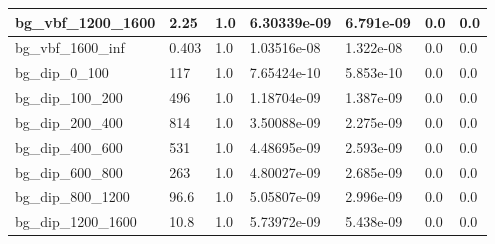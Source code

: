 \documentclass[a4paper, 10pt]{article}
\begin{document}
\begin{table}[H]
\begin{center}
\begin{tabular}{|m{23.0mm}|m{23.0mm}|m{18.0mm}|m{19.0mm}|m{19.0mm}|m{19.0mm}|m{19.0mm}|}
      \hline
      {\cellcolor{white}         bg\_vbf\_1200\_1600}& {\cellcolor{white}         2.25}& {\cellcolor{white}         1.0}& {\cellcolor{white}         6.30339e-09}& {\cellcolor{white}         6.791e-09}& {\cellcolor{green}         0.0}& {\cellcolor{green}         0.0}\\
      \hline
      {\cellcolor{white}         bg\_vbf\_1600\_inf}& {\cellcolor{white}         0.403}& {\cellcolor{white}         1.0}& {\cellcolor{white}         1.03516e-08}& {\cellcolor{white}         1.322e-08}& {\cellcolor{green}         0.0}& {\cellcolor{green}         0.0}\\
      \hline
      {\cellcolor{white}         bg\_dip\_0\_100}& {\cellcolor{white}         117}& {\cellcolor{white}         1.0}& {\cellcolor{white}         7.65424e-10}& {\cellcolor{white}         5.853e-10}& {\cellcolor{green}         0.0}& {\cellcolor{green}         0.0}\\
      \hline
      {\cellcolor{white}         bg\_dip\_100\_200}& {\cellcolor{white}         496}& {\cellcolor{white}         1.0}& {\cellcolor{white}         1.18704e-09}& {\cellcolor{white}         1.387e-09}& {\cellcolor{green}         0.0}& {\cellcolor{green}         0.0}\\
      \hline
      {\cellcolor{white}         bg\_dip\_200\_400}& {\cellcolor{white}         814}& {\cellcolor{white}         1.0}& {\cellcolor{white}         3.50088e-09}& {\cellcolor{white}         2.275e-09}& {\cellcolor{green}         0.0}& {\cellcolor{green}         0.0}\\
      \hline
      {\cellcolor{white}         bg\_dip\_400\_600}& {\cellcolor{white}         531}& {\cellcolor{white}         1.0}& {\cellcolor{white}         4.48695e-09}& {\cellcolor{white}         2.593e-09}& {\cellcolor{green}         0.0}& {\cellcolor{green}         0.0}\\
      \hline
      {\cellcolor{white}         bg\_dip\_600\_800}& {\cellcolor{white}         263}& {\cellcolor{white}         1.0}& {\cellcolor{white}         4.80027e-09}& {\cellcolor{white}         2.685e-09}& {\cellcolor{green}         0.0}& {\cellcolor{green}         0.0}\\
      \hline
      {\cellcolor{white}         bg\_dip\_800\_1200}& {\cellcolor{white}         96.6}& {\cellcolor{white}         1.0}& {\cellcolor{white}         5.05807e-09}& {\cellcolor{white}         2.996e-09}& {\cellcolor{green}         0.0}& {\cellcolor{green}         0.0}\\
      \hline
      {\cellcolor{white}         bg\_dip\_1200\_1600}& {\cellcolor{white}         10.8}& {\cellcolor{white}         1.0}& {\cellcolor{white}         5.73972e-09}& {\cellcolor{white}         5.438e-09}& {\cellcolor{green}         0.0}& {\cellcolor{green}         0.0}\\

\end{tabular}
\end{center}
\end{table}
\end{document}
